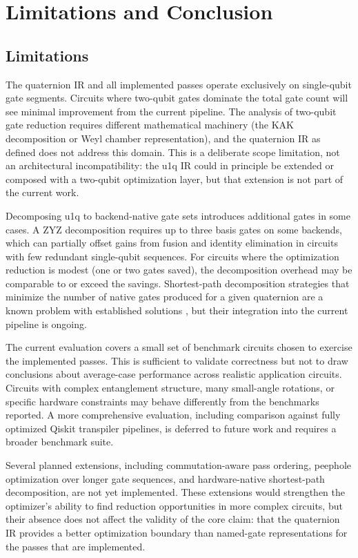 \documentclass[conference]{IEEEtran}
\begin{document}
\section{Limitations and Conclusion}

\subsection{Limitations}

The quaternion IR and all implemented passes operate exclusively on single-qubit gate
segments. Circuits where two-qubit gates dominate the total gate count will see minimal
improvement from the current pipeline. The analysis of two-qubit gate reduction
requires different mathematical machinery (the KAK decomposition or Weyl chamber
representation), and the quaternion IR as defined does not address this domain. This is
a deliberate scope limitation, not an architectural incompatibility: the u1q IR could
in principle be extended or composed with a two-qubit optimization layer, but that
extension is not part of the current work.

Decomposing u1q to backend-native gate sets introduces additional gates in some cases.
A ZYZ decomposition requires up to three basis gates on some backends, which can partially
offset gains from fusion and identity elimination in circuits with few redundant
single-qubit sequences. For circuits where the optimization reduction is modest (one or
two gates saved), the decomposition overhead may be comparable to or exceed the savings.
Shortest-path decomposition strategies that minimize the number of native gates produced
for a given quaternion are a known problem with established solutions \cite{b8}, but their
integration into the current pipeline is ongoing.

The current evaluation covers a small set of benchmark circuits chosen to exercise the
implemented passes. This is sufficient to validate correctness but not to draw conclusions
about average-case performance across realistic application circuits. Circuits with complex
entanglement structure, many small-angle rotations, or specific hardware constraints may
behave differently from the benchmarks reported. A more comprehensive evaluation, including
comparison against fully optimized Qiskit transpiler pipelines, is deferred to future work
and requires a broader benchmark suite.

Several planned extensions, including commutation-aware pass ordering, peephole
optimization over longer gate sequences, and hardware-native shortest-path decomposition,
are not yet implemented. These extensions would strengthen the optimizer's ability to find
reduction opportunities in more complex circuits, but their absence does not affect the
validity of the core claim: that the quaternion IR provides a better optimization boundary
than named-gate representations for the passes that are implemented.
\end{document}
